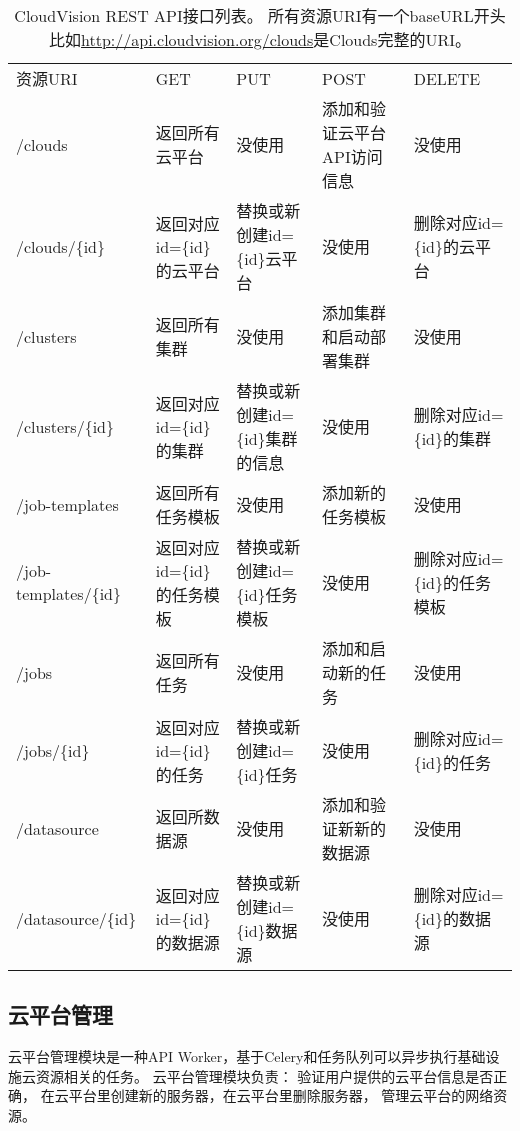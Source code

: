 \begin{table}[H]
  \centering
  \begin{minipage}[t]{0.98\linewidth} %
  \caption[CloudVision API接口列表]{CloudVision REST API接口列表。
    所有资源URI有一个baseURL开头比如\url{http://api.cloudvision.org/clouds}是Clouds完整的URI。}
  \label{tab:cloudvision-api}
    \begin{tabularx}{\linewidth}{lXXXX}
      \toprule[1.5pt]
        资源URI & GET & PUT & POST & DELETE \\
        /clouds & 返回所有云平台 & 没使用 & 添加和验证云平台API访问信息 & 没使用 \\
        /clouds/\{id\} & 返回对应id=\{id\}的云平台 & 替换或新创建id=\{id\}云平台 &  没使用 & 删除对应id=\{id\}的云平台 \\
        /clusters & 返回所有集群 & 没使用 & 添加集群和启动部署集群 & 没使用 \\
        /clusters/\{id\} & 返回对应id=\{id\}的集群 & 替换或新创建id=\{id\}集群的信息 &  没使用 & 删除对应id=\{id\}的集群 \\
        /job-templates & 返回所有任务模板 & 没使用 & 添加新的任务模板 & 没使用 \\
        /job-templates/\{id\} & 返回对应id=\{id\}的任务模板 & 替换或新创建id=\{id\}任务模板 &  没使用 & 删除对应id=\{id\}的任务模板 \\
        /jobs & 返回所有任务 & 没使用 & 添加和启动新的任务 & 没使用 \\
        /jobs/\{id\} & 返回对应id=\{id\}的任务 & 替换或新创建id=\{id\}任务 &  没使用 & 删除对应id=\{id\}的任务 \\
        /datasource & 返回所数据源 & 没使用 & 添加和验证新新的数据源 & 没使用 \\
        /datasource/\{id\} & 返回对应id=\{id\}的数据源 & 替换或新创建id=\{id\}数据源 &  没使用 & 删除对应id=\{id\}的数据源 \\
      \bottomrule[1.5pt]
    \end{tabularx}
  \end{minipage}
\end{table}


\subsection{云平台管理}
\label{subsec:api-worker-cloud}
云平台管理模块是一种API Worker，基于Celery和任务队列可以异步执行基础设施云资源相关的任务。
云平台管理模块负责： 验证用户提供的云平台信息是否正确，
在云平台里创建新的服务器，在云平台里删除服务器，
管理云平台的网络资源。

